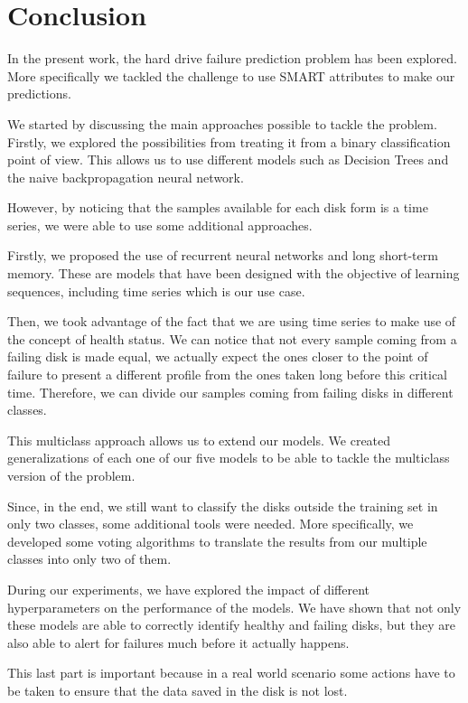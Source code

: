 \chapter{Conclusion}\label{chap:conclusion}

In the present work, the hard drive failure prediction problem has been explored.
More specifically we tackled the challenge to use SMART attributes to make our predictions.

We started by discussing the main approaches possible to tackle the problem.
Firstly, we explored the possibilities from treating it from a binary classification point of view.
This allows us to use different models such as Decision Trees and the naive backpropagation neural network.

However, by noticing that the samples available for each disk form is a time series, we were able to use some additional approaches.

Firstly, we proposed the use of recurrent neural networks and long short-term memory.
These are models that have been designed with the objective of learning sequences, including time series which is our use case.

Then, we took advantage of the fact that we are using time series to make use of the concept of health status.
We can notice that not every sample coming from a failing disk is made equal, we actually expect the ones closer to the point of failure to present a different profile from the ones taken long before this critical time.
Therefore, we can divide our samples coming from failing disks in different classes.

This multiclass approach allows us to extend our models.
We created generalizations of each one of our five models to be able to tackle the multiclass version of the problem.

Since, in the end, we still want to classify the disks outside the training set in only two classes, some additional tools were needed.
More specifically, we developed some voting algorithms to translate the results from our multiple classes into only two of them.

During our experiments, we have explored the impact of different hyperparameters on the performance of the models.
We have shown that not only these models are able to correctly identify healthy and failing disks, but they are also able to alert for failures much before it actually happens.

This last part is important because in a real world scenario some actions have to be taken to ensure that the data saved in the disk is not lost.


